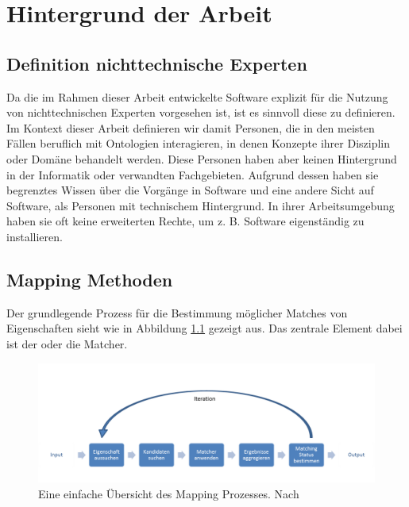%
\chapter{Hintergrund der Arbeit}
\label{chap:background}

	\section{Definition nichttechnische Experten}
	Da die im Rahmen dieser Arbeit entwickelte Software explizit für die Nutzung
	von nichttechnischen Experten vorgesehen ist, ist es sinnvoll diese zu definieren.
	Im Kontext dieser Arbeit definieren wir damit Personen, die in den
	meisten Fällen beruflich mit Ontologien interagieren, in denen Konzepte ihrer Disziplin oder
	Domäne behandelt werden. Diese Personen haben aber keinen Hintergrund in der
	Informatik oder verwandten Fachgebieten. Aufgrund dessen haben sie begrenztes
	Wissen über die Vorgänge in Software und eine andere Sicht auf Software, als
	Personen mit technischem Hintergrund. In ihrer Arbeitsumgebung haben sie oft
	keine erweiterten Rechte, um z. B. Software eigenständig zu installieren.

	\section{Mapping Methoden}
	Der grundlegende Prozess für die Bestimmung möglicher Matches von Eigenschaften
	sieht wie in Abbildung \ref{fig1} gezeigt aus. Das zentrale Element dabei ist
	der oder die Matcher. \cite{Hoo14}
	
	\begin{figure}[ht]
	\centering
	\includegraphics[width=1.0\textwidth]{pics/simple-high-level-view-of-a-mapping-process.png}
	\caption{Eine einfache Übersicht des Mapping Prozesses. Nach \cite{Hoo14}}
	\label{fig1}
	\end{figure}
	
